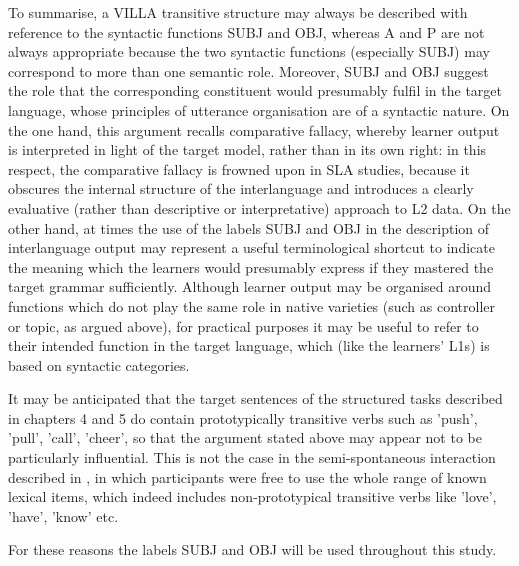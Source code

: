 To summarise, a VILLA transitive structure may always be described with reference to the syntactic functions SUBJ and OBJ, whereas A and P are not always appropriate because the two syntactic functions (especially SUBJ) may correspond to more than one semantic role. Moreover, SUBJ and OBJ suggest the role that the corresponding constituent would presumably fulfil in the target language, whose principles of utterance organisation are of a syntactic nature. On the one hand, this argument recalls  comparative fallacy, whereby learner output is interpreted in light of the target model, rather than in its own right: in this respect, the comparative fallacy is frowned upon in SLA studies, because it obscures the internal structure of the interlanguage and introduces a clearly evaluative (rather than descriptive or interpretative) approach to L2 data. On the other hand, at times the use of the labels SUBJ and OBJ in the description of interlanguage output may represent a useful terminological shortcut to indicate the meaning which the learners would presumably express if they mastered the target grammar sufficiently. Although learner output may be organised around functions which do not play the same role in native varieties (such as controller or topic, as argued above), for practical purposes it may be useful to refer to their intended function in the target language, which (like the learners’ L1s) is based on syntactic categories.

It may be anticipated that the target sentences of the structured tasks described in chapters 4 and 5 do contain prototypically transitive verbs such as 'push', 'pull', 'call', 'cheer', so that the argument stated above may appear not to be particularly influential. This is not the case in the semi-spontaneous interaction described in , in which participants were free to use the whole range of known lexical items, which indeed includes non-prototypical transitive verbs like 'love', 'have', 'know' etc.

For these reasons the labels SUBJ and OBJ will be used throughout this study. 

